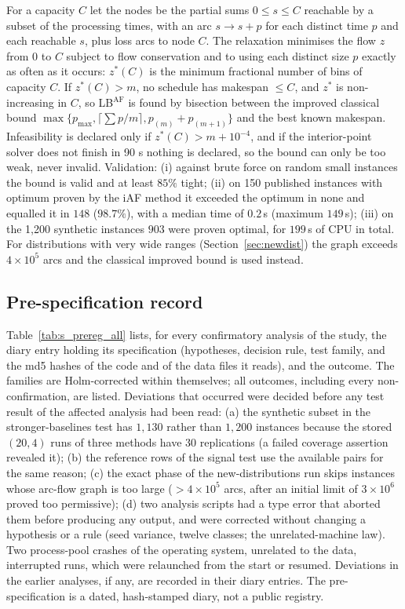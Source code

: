 \documentclass[final,3p,times,11pt,authoryear]{elsarticle}
\begin{document}
For a capacity $C$ let the nodes be the partial sums $0\leq s\leq C$
reachable by a subset of the processing times, with an arc $s\to s+p$ for
each distinct time $p$ and each reachable $s$, plus loss arcs to node $C$.
The relaxation minimises the flow $z$ from $0$ to $C$ subject to flow
conservation and to using each distinct size $p$ exactly as often as it
occurs: $z^{*}(C)$ is the minimum fractional number of bins of capacity $C$.
If $z^{*}(C)>m$, no schedule has makespan $\leq C$, and $z^{*}$ is
non-increasing in $C$, so LB$^{\mathrm{AF}}$ is found by bisection between
the improved classical bound $\max\{p_{\max},\lceil\sum p/m\rceil,p_{(m)}+p_{(m+1)}\}$
and the best known makespan. Infeasibility is declared only if
$z^{*}(C)>m+10^{-4}$, and if the interior-point solver does not finish in 90 s
nothing is declared, so the bound can only be too weak, never invalid.
Validation: (i) against brute force on random small instances the bound is
valid and at least $85\%$ tight; (ii) on 150 published instances with
optimum proven by the iAF method it exceeded the optimum in none and
equalled it in $148$ ($98.7\%$), with a median time of $0.2$\,s (maximum
$149$\,s); (iii) on the 1{,}200 synthetic instances $903$ were proven optimal,
for $199$\,s of CPU in total. For distributions with very wide ranges
(Section~\ref{sec:newdist}) the graph exceeds $4\times10^{5}$ arcs and
the classical improved bound is used instead.

\subsection{Pre-specification record}
\label{sec:prereg-record}

Table~\ref{tab:s_prereg_all} lists, for every confirmatory analysis of the study,
the diary entry holding its specification (hypotheses, decision rule, test family,
and the md5 hashes of the code and of the data files it reads), and the outcome. The
families are Holm-corrected within themselves; all outcomes, including every
non-confirmation, are listed. Deviations that occurred were decided before any test
result of the affected analysis had been read: (a) the synthetic subset in the
stronger-baselines test has $1{,}130$ rather than $1{,}200$ instances because the stored
$(20,4)$ runs of three methods have 30 replications (a failed coverage assertion
revealed it); (b) the reference rows of the signal test use the available pairs for the
same reason; (c) the exact phase of the new-distributions run skips instances whose
arc-flow graph is too large ($>4\times10^{5}$ arcs, after an initial limit of
$3\times10^{6}$ proved too permissive); (d) two analysis scripts had a type error
that aborted them before producing any output, and were corrected without changing a
hypothesis or a rule (seed variance, twelve classes; the unrelated-machine law). Two
process-pool crashes of the operating system, unrelated to the data, interrupted
runs, which were relaunched from the start or resumed. Deviations in the earlier
analyses, if any, are recorded in their diary entries. The pre-specification is a
dated, hash-stamped diary, not a public registry.



\begingroup\scriptsize\setlength{\bibsep}{0pt}


\endgroup
\end{document}
